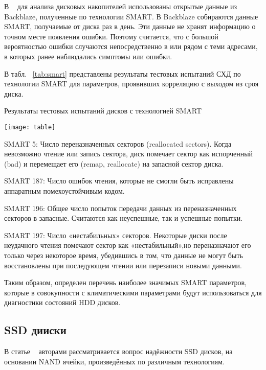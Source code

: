 В ~\cite{diskred} для анализа дисковых накопителей использованы открытые данные из Backblaze,  полученные  по  технологии SMART.  В Backblaze собираются  данные SMART,  получаемые  от диска  раз  в день.  Эти данные не хранят информацию о точном месте появления ошибки. Поэтому считается, что с большой вероятностью ошибки случаются непосредственно в или рядом с теми адресами, в которых ранее наблюдались симптомы или ошибки.

В табл. ~\ref{tab:smart} представлены результаты тестовых испытаний СХД по технологии SMART для параметров, проявивших корреляцию с выходом из сроя диска.
\begin{table}
	\captionsetup{skip=5pt}
	\caption{Результаты тестовых испытаний дисков с технологией SMART}
	\centering
	\texttt{[image: table]}
	\label{tab:smart}
\end{table}
\begin{itemize*}
	\item{SMART 5:  Число  переназначенных  секторов  (reallocated sectors).  Когда 
невозможно чтение или запись сектора, диск помечает сектор как испорченный (bad) и перемещает его (remap, reallocate) на запасной сектор диска.}
	\item{SMART 187:  Число  ошибок  чтения,  которые  не  смогли  быть  исправлены 
аппаратным помехоустойчивым кодом.}
	\item{SMART 196:  Общее  число  попыток  передачи  данных  из  переназначенных 
секторов в запасные. Считаются как неуспешные, так и успешные попытки.}
	\item{SMART 197:  Число «нестабильных» секторов.  Некоторые  диски  после 
неудачного  чтения  помечают  сектор  как «нестабильный»,но  переназначают  его 
только  через  некоторое  время,  убедившись  в  том,  что  данные  не  могут  быть 
восстановлены при последующем чтении или перезаписи новыми данными.} 
\end{itemize*}

Таким образом, определен перечень наиболее значимых SMART параметров, которые в совокупности с климатическими параметрами будут использоваться для  диагностики состояний HDD дисков. 
\subsection{SSD дииски}

В статье ~\cite{reliabil} авторами рассматривается вопрос надёжности SSD дисков, на основании NAND ячейки, произведённых по различным технологиям.

